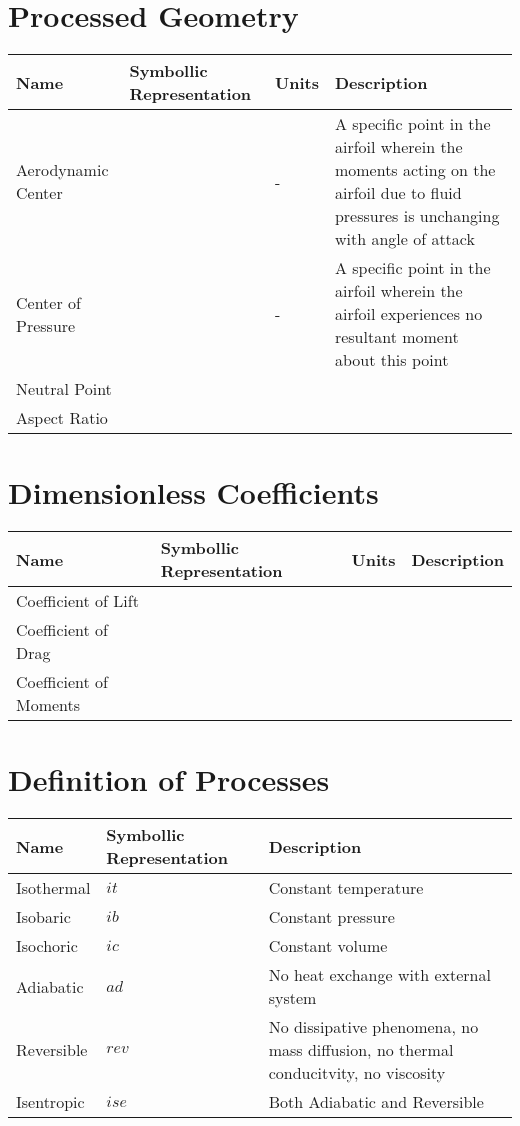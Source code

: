 \documentclass[a4paper, 12pt]{report}
\begin{document}
\begin{center}
\section{Processed Geometry}
\begin{comment}
\end{comment}
\begin{tabular}{|m{\tabsize}|m{\tabsize}|m{\tabsize}|m{\tabsizel}|}
\hline
Name & Symbollic Representation & Units & Description \\
\hline
Aerodynamic Center &  & - & A specific point in the airfoil wherein the moments acting on the airfoil due to fluid pressures is unchanging with angle of attack \\ 
\hline
Center of Pressure & & - & A specific point in the airfoil wherein the airfoil experiences no resultant moment about this point\\ 
\hline
Neutral Point & & & \\ 
\hline
Aspect Ratio & & & \\ 
\hline
\end{tabular}
\section{Dimensionless Coefficients}
\begin{comment}
\end{comment}
\begin{tabular}{|m{\tabsize}|m{\tabsize}|m{\tabsize}|m{\tabsize}|}
\hline
Name & Symbollic Representation & Units & Description \\
\hline
Coefficient of Lift & & & \\ 
\hline
Coefficient of Drag & & & \\ 
\hline
Coefficient of Moments & & & \\ 
\hline
\end{tabular}
\section{Definition of Processes}
\begin{comment}
\end{comment}
\begin{tabular}{|m{\tabsize}|m{\tabsize}|m{\tabsizel}|}
\hline
Name & Symbollic Representation & Description \\
\hline
Isothermal & $it$ & Constant temperature \\
\hline
Isobaric & $ib$ & Constant pressure \\
\hline
Isochoric & $ic$ & Constant volume \\
\hline
Adiabatic & $ad$ & No heat exchange with external system \\
\hline
Reversible & $rev$ & No dissipative phenomena, no mass diffusion, no thermal conducitvity, no viscosity \\
\hline
Isentropic & $ise$ & Both Adiabatic and Reversible \\
\hline
\end{tabular}
\end{center}
\end{document}
